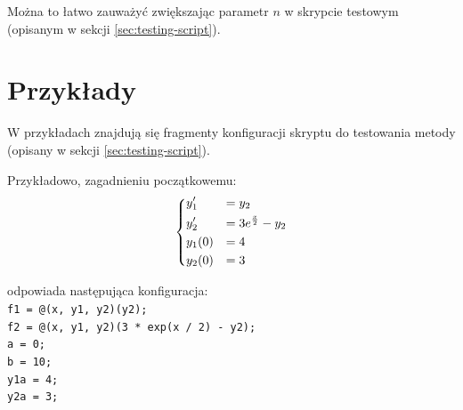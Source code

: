 \documentclass[12pt]{article}
\begin{document}
	Można to łatwo zauważyć zwiększając parametr $n$ w skrypcie testowym (opisanym w sekcji \ref{sec:testing-script}).
	
	
	
	\section{Przykłady}
	W przykładach znajdują się fragmenty konfiguracji skryptu do testowania metody (opisany w sekcji \ref{sec:testing-script}).
	
	Przykładowo, zagadnieniu początkowemu:
	\begin{align*}
	\begin{dcases}
		y_1' &= y_2 \\
		y_2' &= 3e^\frac{x}{2} - y_2 \\
		y_1(0) &= 4 \\
		y_2(0) &= 3
	\end{dcases}
	\end{align*}
	
	odpowiada następująca konfiguracja:
	\\
	\texttt{f1 = @(x, y1, y2)(y2); \\
		f2 = @(x, y1, y2)(3 * exp(x / 2) - y2); \\
		a = 0; \\
		b = 10; \\
		y1a = 4; \\
		y2a = 3; \\	
	}
\end{document}
